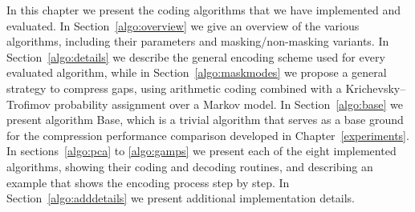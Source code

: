 





In this chapter we present the coding algorithms that we have implemented and evaluated. In Section~\ref{algo:overview} we give an overview of the various algorithms, including their parameters and masking/non-masking variants. In Section~\ref{algo:details} we describe the general encoding scheme used for every evaluated algorithm, while in Section~\ref{algo:maskmodes} we propose a general strategy to compress gaps, using arithmetic coding combined with a Krichevsky–Trofimov probability assignment over a Markov model. In Section~\ref{algo:base} we present algorithm Base, which is a trivial algorithm that serves as a base ground for the compression performance comparison developed in Chapter~\ref{experiments}. In sections~\ref{algo:pca} to \ref{algo:gamps} we present each of the eight implemented algorithms, showing their coding and decoding routines, and describing an example that shows the encoding process step by step. In Section~\ref{algo:adddetails} we present additional implementation details. 

